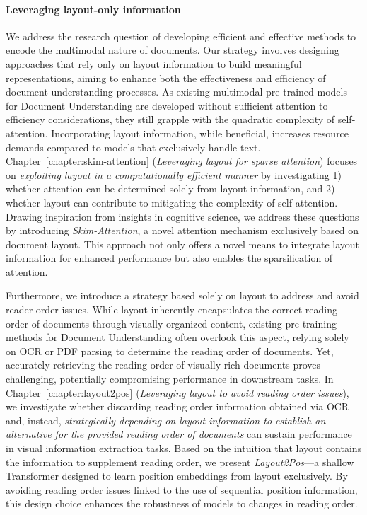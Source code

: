 \paragraph{Leveraging layout-only information} We address the research question of developing efficient and effective methods to encode the multimodal nature of documents. Our strategy involves designing approaches that rely only on layout information to build meaningful representations, aiming to enhance both the effectiveness and efficiency of document understanding processes. As existing multimodal pre-trained models for Document Understanding are developed without sufficient attention to efficiency considerations, they still grapple with the quadratic complexity of self-attention. Incorporating layout information, while beneficial, increases resource demands compared to models that exclusively handle text. Chapter~\ref{chapter:skim-attention} (\textit{Leveraging layout for sparse attention}) focuses on \textit{exploiting layout in a computationally efficient manner} by investigating 1) whether attention can be determined solely from layout information, and 2) whether layout can contribute to mitigating the complexity of self-attention. Drawing inspiration from insights in cognitive science, we address these questions by introducing \textit{Skim-Attention}, a novel attention mechanism exclusively based on document layout. This approach not only offers a novel means to integrate layout information for enhanced performance but also enables the sparsification of attention.


Furthermore, we introduce a strategy based solely on layout to address and avoid reader order issues. While layout inherently encapsulates the correct reading order of documents through visually organized content, existing pre-training methods for Document Understanding often overlook this aspect, relying solely on \ac{OCR} or PDF parsing to determine the reading order of documents. Yet, accurately retrieving the reading order of visually-rich documents proves challenging, potentially compromising performance in downstream tasks. In Chapter~\ref{chapter:layout2pos} (\textit{Leveraging layout to avoid reading order issues}), we investigate whether discarding reading order information obtained via \ac{OCR} and, instead, \textit{strategically depending on layout information to establish an alternative for the provided reading order of documents} can sustain performance in visual information extraction tasks. Based on the intuition that layout contains the information to supplement reading order, we present \textit{Layout2Pos}—a shallow Transformer designed to learn position embeddings from layout exclusively. By avoiding reading order issues linked to the use of sequential position information, this design choice enhances the robustness of models to changes in reading order.


